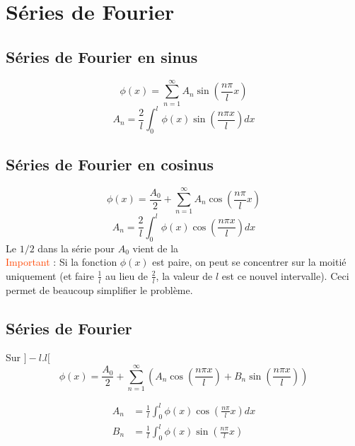 \documentclass[resume]{subfiles}
\begin{document}
\section{Séries de Fourier}
\subsection{Séries de Fourier en sinus}
$$\boxed{\phi(x)=\sum_{n=1}^{\infty}A_n\sin\left(\frac{n\pi}{l}x\right)}$$
$$\boxed{A_n=\frac{2}{l}\int_{0}^{l}\phi(x)\sin\left(\frac{n\pi x}{l}\right)dx}$$
\subsection{Séries de Fourier en cosinus}
$$\boxed{\phi(x)=\frac{A_0}{2}+\sum_{n=1}^{\infty}A_n\cos\left(\frac{n\pi}{l}x\right)}$$
$$\boxed{A_n=\frac{2}{l}\int_{0}^{l}\phi(x)\cos\left(\frac{n\pi x}{l}\right)dx}$$
Le $1/2$ dans la série pour $A_0$ vient de la\\
\textcolor{OrangeRed}{Important} : Si la fonction $\phi(x)$ est paire, on peut se concentrer sur la moitié uniquement (et faire $\frac{1}{l}$ au lieu de $\frac{2}{l}$, la valeur de $l$ est ce nouvel intervalle). Ceci permet de beaucoup simplifier le problème.
\subsection{Séries de Fourier}
Sur $]-l.l[$
$$\boxed{\phi(x)=\frac{A_0}{2}+\sum_{n=1}^{\infty}\left(A_n\cos\left(\frac{n\pi x}{l}\right)+B_n\sin\left(\frac{n\pi x}{l}\right)\right)}$$

\begin{align*}
A_n &= \frac{1}{l}\int_{0}^{l}\phi(x)\cos\left(\frac{n\pi}{l}x\right)dx\\
B_n &=\frac{1}{l}\int_{0}^{l}\phi(x)\sin\left(\frac{n\pi}{l}x\right)
\end{align*}
\end{document}
